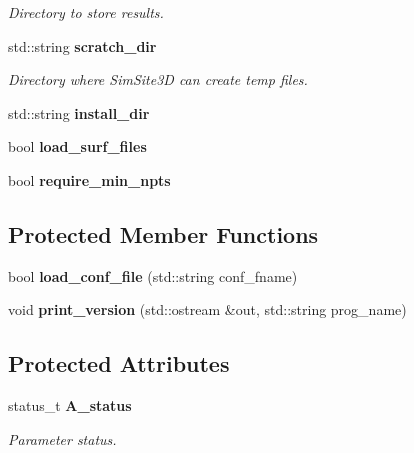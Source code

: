 \begin{CompactItemize}
\begin{CompactList}\small\item\em Directory to store results. \item\end{CompactList}\item 
std::string \bf{scratch\_\-dir}\label{classSimSite3D_1_1BaseParameters_96aa06a7fff08e400ec92d0ada56b786}

\begin{CompactList}\small\item\em Directory where SimSite3D can create temp files. \item\end{CompactList}\item 
std::string \textbf{install\_\-dir}\label{classSimSite3D_1_1BaseParameters_6fc273afb61ac03e5e733e704b9003d5}

\item 
bool \textbf{load\_\-surf\_\-files}\label{classSimSite3D_1_1BaseParameters_dd007d2ec07c2f19ed5eb847cede37e7}

\item 
bool \textbf{require\_\-min\_\-npts}\label{classSimSite3D_1_1BaseParameters_2cbb07424c917a0593f1d40ea08bec81}

\end{CompactItemize}
\subsection*{Protected Member Functions}
\begin{CompactItemize}
\item 
bool \textbf{load\_\-conf\_\-file} (std::string conf\_\-fname)\label{classSimSite3D_1_1BaseParameters_0bb99f45e58ded09c08f202dc662fb2c}

\item 
void \textbf{print\_\-version} (std::ostream \&out, std::string prog\_\-name)\label{classSimSite3D_1_1BaseParameters_dd81fff1ee86b790d0ee408cf3834116}

\end{CompactItemize}
\subsection*{Protected Attributes}
\begin{CompactItemize}
\item 
status\_\-t \bf{A\_\-status}\label{classSimSite3D_1_1BaseParameters_552075c2455c9ce279594f9d620de06a}

\begin{CompactList}\small\item\em Parameter status. \item\end{CompactList}\end{CompactItemize}

